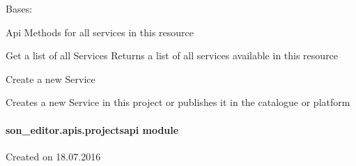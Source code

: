 \documentclass[letterpaper,10pt,english]{sphinxmanual}
\begin{document}

\begin{fulllineitems}
\label{_source/son_editor.apis:son_editor.apis.project_servicesapi.Services}
Bases: 

Api Methods for all services in this resource

\begin{fulllineitems}
\label{_source/son_editor.apis:son_editor.apis.project_servicesapi.Services.get}
Get a list of all Services
Returns a list of all services available in this resource

\end{fulllineitems}


\begin{fulllineitems}
\label{_source/son_editor.apis:son_editor.apis.project_servicesapi.Services.methods}
\end{fulllineitems}


\begin{fulllineitems}
\label{_source/son_editor.apis:son_editor.apis.project_servicesapi.Services.post}
Create a new Service

Creates a new Service in this project or
publishes it in the catalogue or platform

\end{fulllineitems}


\end{fulllineitems}



\paragraph{son\_editor.apis.projectsapi module}
\label{_source/son_editor.apis:module-son_editor.apis.projectsapi}\label{_source/son_editor.apis:son-editor-apis-projectsapi-module}
Created on 18.07.2016
\end{document}
